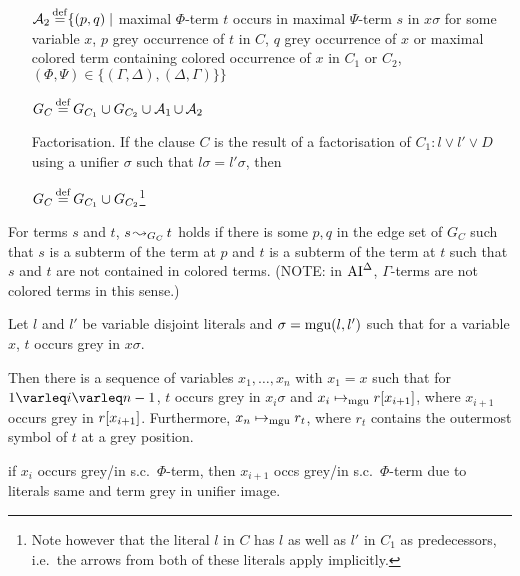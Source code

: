 \documentclass[,%
	draft=false,%
	numbers=noendperiod
	11pt,
	a4paper,
	oneside,%
	openany,
]{memoir}
\begin{document}
\begin{defi}
\begin{itemize}
			$\operatorname{\mathcal{A}}_2 \operatorname{\stackrel{\mathrm{def}}{=}} \{ (p, q) \mid $ maximal $\Phi$-term $t$ occurs in maximal $\Psi$-term $s$ in $x\sigma$ for some variable $x$, $p$ grey occurrence of $t$ in $C$, $q$ grey occurrence of $x$ or maximal colored term containing colored occurrence of $x$ in $C_1$ or $C_2$,
			$(\Phi, \Psi) \in \{(\Gamma, \Delta), (\Delta, \Gamma)\} \} $


			$G_C \operatorname{\stackrel{\mathrm{def}}{=}} G_{C_1} \cup G_{C_2} \cup \operatorname{\mathcal{A}}_1 \cup \operatorname{\mathcal{A}}_2$


		\item[Factorisation.]
			If the clause $C$ is the result of a factorisation of $C_1: l \lor l' \lor D$ using a unifier $\sigma$ such that $l\sigma = l'\sigma$, then

			$G_C \operatorname{\stackrel{\mathrm{def}}{=}} G_{C_1} \cup G_{C_2}$\footnote{Note however that the literal $l$ in $C$ has $l$ as well as $l'$ in $C_1$ as predecessors, i.e.~the arrows from both of these literals apply implicitly.}
			\qedhere
	\end{itemize}
\end{defi}

\begin{defi}[$\apath$]
	For terms $s$ and $t$, $s\operatorname{\leadsto}_{G_C} t$ holds if there is some $p, q$ in the edge set of $G_C$ such that $s$ is a subterm of the term at $p$ and $t$ is a subterm of the term at $t$ such that $s$ and $t$ are not contained in colored terms. (NOTE: in $\operatorname{AI}^\Delta$, $\Gamma$-terms are not colored terms in this sense.)
\end{defi}


\begin{lemma}
	\label{lemma:unified_term_starts_somewhere_grey}
	Let $l$ and $l'$ be variable disjoint literals and $\sigma = \operatorname{mgu}(l, l')$
	such that for a variable $x$, $t$ occurs grey in $x\sigma$.

	Then there is a sequence of variables $x_1,\dots, x_n$ with $x_1 = x$ such that for $1\varleq i \varleq n-1$,
	$t$ occurs grey in $x_i \sigma$ and
	$x_i \mapsto_{\operatorname{mgu}} r[x_{i+1}]$, where $x_{i+1}$ occurs grey in $r[x_{i+1}]$.
	Furthermore,
	$x_n \mapsto_{\operatorname{mgu}} r_t$, where $r_t$ contains the outermost symbol of $t$ at a grey position.


	 if $x_i$ occurs grey/in s.c.\ $\Phi$-term, then $x_{i+1}$ occs grey/in s.c.\ $\Phi$-term due to literals same and term grey in unifier image.
\end{lemma}
\end{document}

